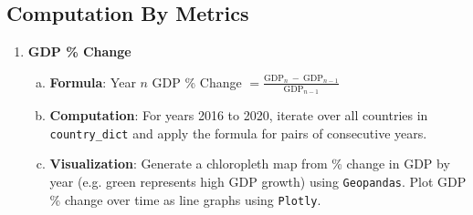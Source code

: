 \documentclass[fontsize=11pt]{article}
\begin{document}
    \subsection*{Computation By Metrics}
    \begin{enumerate}
        \item \textbf{GDP \% Change}
            \begin{enumerate}[(a)]
                \item \textbf{Formula}: Year $n$ GDP \% Change $= \frac{\text{GDP}_{n} \ - \ \text{GDP}_{n-1}}{\text{GDP}_{n-1}}$
                \item \textbf{Computation}: For years 2016 to 2020, iterate over all countries in \texttt{country\_dict} and apply the formula for pairs of consecutive years.
                \item \textbf{Visualization}: Generate a chloropleth map from \% change in GDP by year (e.g. green represents high GDP growth) using \texttt{Geopandas}. Plot GDP \% change over time as line graphs using \texttt{Plotly}.
            \end{enumerate}


\end{enumerate}
\end{document}
